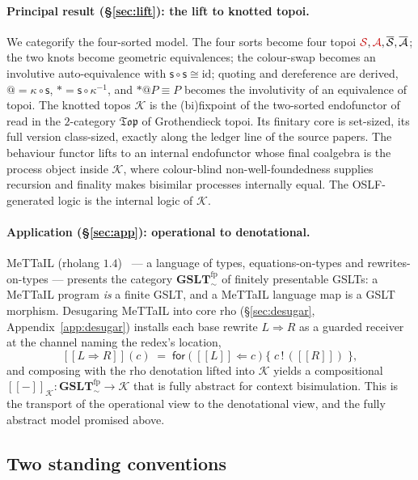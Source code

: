 \documentclass[11pt]{article}
\makeatletter
\newcommand{\sem}[1]{[\![#1]\!]}
\newcommand{\Top}{\mathfrak{Top}}
\newcommand{\GSLTfp}{\mathbf{GSLT}^{\mathrm{fp}}_{\!\sim}}
\newcommand{\swap}{\mathsf{s}}
\newcommand{\id}{\mathrm{id}}
\newcommand{\Ks}{\mathcal{K}}
\newcommand{\for}[2]{\mathsf{for}(#1 \Leftarrow #2)}
\newcommand{\out}[2]{#1\,!\,(#2)}
\newcommand{\quo}[1]{@#1}
\newcommand{\drf}[1]{{*}#1}
\newcommand{\rc}[1]{\textcolor{redcopy}{#1}}   %
\newcommand{\St}{\rc{\mathcal S}}
\newcommand{\At}{\rc{\mathcal A}}
\newcommand{\bSt}{\overline{\mathcal S}}
\newcommand{\bAt}{\overline{\mathcal A}}
\theoremstyle{plain}
\theoremstyle{definition}
\theoremstyle{remark}
\makeatother
\begin{document}
\paragraph{Principal result (\S\ref{sec:lift}): the lift to knotted topoi.} We categorify the
four-sorted model. The four sorts become four topoi
$\St,\At,\bSt,\bAt$; the two knots become geometric equivalences; the colour-swap becomes an
involutive auto-equivalence with $\swap\circ\swap\cong\id$; quoting and dereference are derived,
$\quo{}=\kappa\circ\swap$, $\drf{}=\swap\circ\kappa^{-1}$, and $\drf{}\quo{}P\equiv P$ becomes the
involutivity of an equivalence of topoi. The knotted topos $\Ks$ is the (bi)fixpoint of the
two-sorted endofunctor of~\cite[\S8.1]{rset} read in the $2$-category $\Top$ of Grothendieck topoi.
Its finitary core is set-sized, its full version class-sized, exactly along the ledger line of the
source papers. The behaviour functor lifts to an internal endofunctor whose final coalgebra is the
process object inside $\Ks$, where colour-blind non-well-foundedness supplies recursion and finality
makes bisimilar processes internally equal. The OSLF-generated logic is the internal logic of $\Ks$.

\paragraph{Application (\S\ref{sec:app}): operational to denotational.} MeTTaIL (rholang
$1.4$)~\cite{mettail} --- a language of types, equations-on-types and rewrites-on-types --- presents
the category $\GSLTfp$ of finitely presentable GSLTs: a MeTTaIL program \emph{is} a finite GSLT, and
a MeTTaIL language map is a GSLT morphism. Desugaring MeTTaIL into core rho (\S\ref{sec:desugar},
Appendix~\ref{app:desugar}) installs each base rewrite $L\Rightarrow R$ as a guarded receiver at the
channel naming the redex's location,
\[
\sem{L\Rightarrow R}(c)\;=\;\for{\sem{L}}{c}\bigl\{\;\out{c}{\sem{R}}\;\bigr\},
\]
and composing with the rho denotation lifted into $\Ks$ yields a compositional
$\sem{-}_{\Ks}\colon\GSLTfp\to\Ks$ that is fully abstract for context bisimulation. This is the
transport of the operational view to the denotational view, and the fully abstract model promised
above.

\subsection{Two standing conventions}
\end{document}
